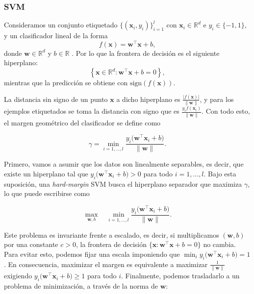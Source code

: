 \subsubsection{SVM} 

Consideramos un conjunto etiquetado $\{(\mathbf{x}_i,y_i)\}_{i=1}^l$ con $\mathbf{x}_i\in\mathbb{R}^d$ e $y_i\in\{-1,1\}$, y un clasificador lineal de la forma
\begin{equation}
f(\mathbf{x})=\mathbf{w}^{\top}\mathbf{x}+b,
\end{equation}
donde $\mathbf{w}\in\mathbb{R}^d$ y $b\in\mathbb{R}$ \cite{zhu2009introduction}. Por lo que la frontera de decisión es el siguiente hiperplano:
\begin{equation}
\left\{\mathbf{x}\in\mathbb{R}^d: \mathbf{w}^{\top}\mathbf{x}+b=0\right\},
\end{equation}
mientras que la predicción se obtiene con $\mathrm{sign}(f(\mathbf{x}))$.

La distancia sin signo de un punto $\mathbf{x}$ a dicho hiperplano es $\frac{|f(\mathbf{x})|}{\|\mathbf{w}\|}$, y para los ejemplos etiquetados se toma la distancia con signo que es $\frac{y_i f(\mathbf{x}_i)}{\|\mathbf{w}\|}$. Con todo esto, el margen geométrico del clasificador se define como

\begin{equation}
\gamma = \min_{i=1,\dots,l} \frac{y_i\bigl(\mathbf{w}^{\top}\mathbf{x}_i+b\bigr)}{\|\mathbf{w}\|}.
\end{equation}

Primero, vamos a asumir que los datos son linealmente separables, es decir, que existe un hiperplano tal que $y_i\bigl(\mathbf{w}^{\top}\mathbf{x}_i+b\bigr)>0$ para todo $i=1,\dots,l$. Bajo esta suposición, una \textit{hard-margin} \gls{SVM} busca el hiperplano separador que maximiza $\gamma$, lo que puede escribirse como

\begin{equation}
\max_{\mathbf{w},b} \quad \min_{i=1,\dots,l} \frac{y_i\bigl(\mathbf{w}^{\top}\mathbf{x}_i+b\bigr)}{\|\mathbf{w}\|}.
\end{equation}

Este problema es invariante frente a escalado, es decir, si multiplicamos $(\mathbf{w},b)$ por una constante $c>0$, la frontera de decisión $\{\mathbf{x}: \mathbf{w}^{\top}\mathbf{x}+b=0\}$ no cambia. Para evitar esto, podemos fijar una escala imponiendo que $\min_i y_i\bigl(\mathbf{w}^{\top}\mathbf{x}_i+b\bigr)=1$. En consecuencia, maximizar el margen es equivalente a maximizar $\frac{1}{\|\mathbf{w}\|}$ exigiendo $y_i\bigl(\mathbf{w}^{\top}\mathbf{x}_i+b\bigr)\ge 1$ para todo $i$. Finalmente, podemos trasladarlo a un problema de minimización, a través de la norma de $\mathbf{w}$:

